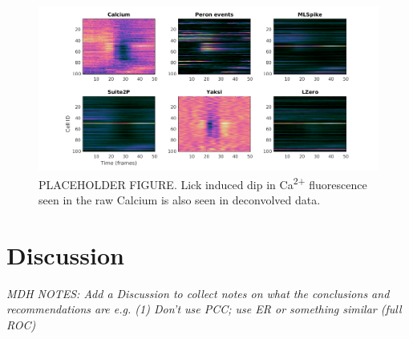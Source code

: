 \documentclass[a4paper,10pt,twocolumn]{article}
\begin{document}
\begin{figure}[H]
\includegraphics[width=\textwidth]{psth2_1260.png}
\caption{\label{fig:lick_PSTH} PLACEHOLDER FIGURE. Lick induced dip in Ca\textsuperscript{2+} fluorescence seen in the raw Calcium is also seen in deconvolved data.}
\end{figure}









\section{Discussion}
\emph{MDH NOTES: Add a Discussion to collect notes on what the conclusions and recommendations are e.g.
(1) Don’t use PCC; use ER or something similar (full ROC)}
\end{document}

